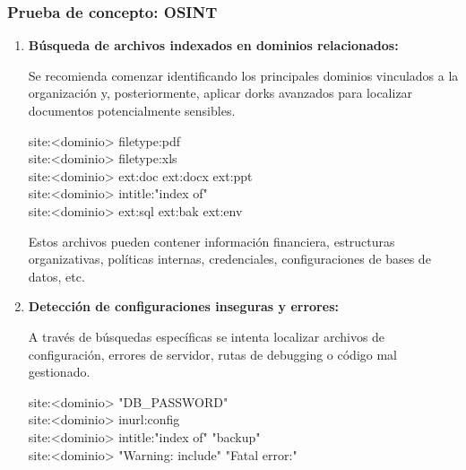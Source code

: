 \documentclass[a4paper, 11pt]{article}
\begin{document}
\vspace{0.5cm}

\vspace{0.5cm}





\vspace{0.5cm}
\subsubsection*{Prueba de concepto: OSINT}

\begin{enumerate}
    \item \textbf{Búsqueda de archivos indexados en dominios relacionados:}

    Se recomienda comenzar identificando los principales dominios vinculados a la organización y, posteriormente, aplicar dorks avanzados para localizar documentos potencialmente sensibles.

    \begin{tcolorbox}[colback=yellow!20!white, colframe=orange!80!black, title={Dorks para documentos y configuraciones}]
    \small
    site:<dominio> filetype:pdf \\
    site:<dominio> filetype:xls \\
    site:<dominio> ext:doc \textbar{} ext:docx \textbar{} ext:ppt \\
    site:<dominio> intitle:"index of" \\
    site:<dominio> ext:sql \textbar{} ext:bak \textbar{} ext:env
    \end{tcolorbox}

    Estos archivos pueden contener información financiera, estructuras organizativas, políticas internas, credenciales, configuraciones de bases de datos, etc.

    \item \textbf{Detección de configuraciones inseguras y errores:}

    A través de búsquedas específicas se intenta localizar archivos de configuración, errores de servidor, rutas de debugging o código mal gestionado.

 
\begin{tcolorbox}[colback=yellow!20!white, colframe=orange!80!black, title={Dorks para errores y configuraciones expuestas}]
    \small
    site:<dominio> "DB\_PASSWORD" \\
    site:<dominio> inurl:config \\
    site:<dominio> intitle:"index of" "backup" \\
    site:<dominio> "Warning: include" \textbar{} "Fatal error:"
    \end{tcolorbox}


\end{enumerate}
\end{document}

